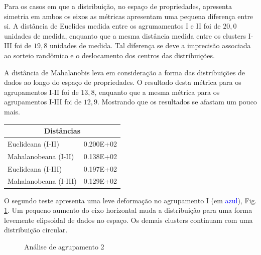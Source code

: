 Para os casos em que a distribuição, no espaço de propriedades, apresenta simetria em ambos os eixos as métricas apresentam uma pequena diferença entre si. A distância de Euclides medida entre os agrumamentos I e II foi de $20,0$ unidades de medida, enquanto que a mesma distância medida entre os clusters I-III foi de $19,8$ unidades de medida. Tal diferença se deve a imprecisão associada ao sorteio randômico e o deslocamento dos centros das distribuições. 

A distância de Mahalanobis leva em consideração a forma das distribuições de dados ao longo do espaço de propriedades.  O resultado desta métrica para os agrupamentos I-II foi de $13,8$, enquanto que a mesma métrica para os agrupamentos I-III foi de $12,9$. Mostrando que os resultados se afastam um pouco mais.
 
 \begin{table}[H]
 	\centering
 	\label{metrica1}
 	\begin{tabular}{|l|l|}
 		\hline
 		\multicolumn{2}{|c|}{Distâncias}  \\ \hline
 		Euclideana (I-II)     & 0.200E+02 \\ \hline
 		Mahalanobeana (I-II)  & 0.138E+02 \\ \hline
 		Euclideana (I-III)    & 0.197E+02 \\ \hline
 		Mahalanobeana (I-III) & 0.129E+02 \\ \hline
 	\end{tabular}
 \end{table}


O segundo teste apresenta uma leve deformação no agrupamento I (em \textcolor{blue}{azul}), Fig. \ref{AC2}.  Um pequeno aumento do eixo horizontal muda a distribuição para uma forma levemente elipsoidal de dados no espaço. Os demais clusters continuam com uma distribuição circular.



\begin{figure}[H]
	\centering
	\setlength{\fboxsep}{8pt}
	\setlength{\fboxrule}{0.1pt}
	\caption{Análise de agrupamento 2}
	\label{AC2}
\end{figure}


